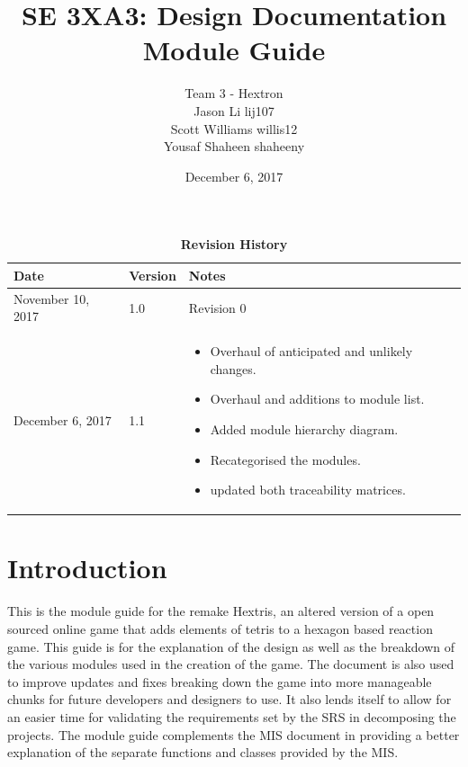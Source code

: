 \documentclass[12pt, titlepage]{article}
\title{SE 3XA3: Design Documentation \\ Module Guide}
\author{Team 3 - Hextron
		\\ Jason Li lij107
		\\ Scott Williams willis12
		\\ Yousaf Shaheen shaheeny
}
\date{December 6, 2017}
\begin{document}
\maketitle

\tableofcontents
\listoftables
\listoffigures
\newpage

\begin{table}[]
\caption{\bf Revision History}
\begin{tabularx}{\textwidth}{p{3cm}p{2cm}X}
\toprule {\bf Date} & {\bf Version} & {\bf Notes}\\
\midrule
November 10, 2017 & 1.0 & Revision 0 \\ \hline
December 6, 2017 & 1.1 & \begin{itemize}[leftmargin=0cm,itemindent=.5cm,labelwidth=\itemindent,labelsep=0cm,align=left,itemsep = 0mm,nosep]


  \item Overhaul of anticipated and unlikely changes.
  \item Overhaul and additions to module list.
  \item Added module hierarchy diagram.
  \item Recategorised the modules.
  \item updated both traceability matrices.
  
\end{itemize} \\
\bottomrule
\end{tabularx}
\end{table}
\vspace*{\fill}


\newpage
{}
\newpage
\section{Introduction}
This is the module guide for the remake Hextris, an altered version of a open sourced online game that adds elements of tetris to a hexagon based reaction game. This guide is for the explanation of the design as well as the breakdown of the various modules used in the creation of the game. The document is also used to improve updates and fixes breaking down the game into more manageable chunks for future developers and designers to use. It also lends itself to allow for an easier time for  validating the requirements set by the SRS in decomposing the projects. The module guide complements the MIS document in providing a better explanation of the separate functions and classes provided by the MIS. 
\end{document}
